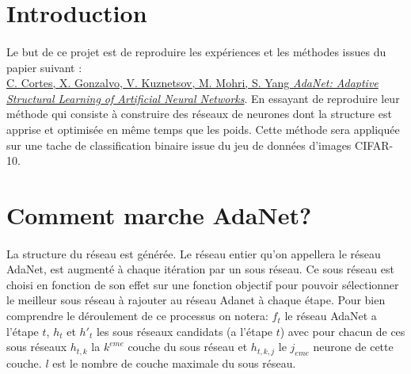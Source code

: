 \documentclass[11 pt]{article}
\begin{document}

\section*{Introduction}
\paragraph{}Le but de ce projet est de reproduire les expériences et les méthodes issues du papier suivant :\\
\href{https://arxiv.org/pdf/1607.01097.pdf}{C. Cortes, X. Gonzalvo, V. Kuznetsov, M. Mohri, S. Yang \emph{AdaNet: Adaptive Structural Learning of Artificial Neural Networks}}.
En essayant de reproduire leur méthode qui consiste à construire des réseaux de neurones dont la structure est apprise et optimisée en même temps que les poids. Cette méthode sera appliquée sur une tache de classification binaire issue du jeu de données d'images CIFAR-10.

\section{Comment marche AdaNet?}
\paragraph{}La structure du réseau est générée. Le réseau entier qu'on appellera le réseau AdaNet, est augment\'e à chaque itération par un sous réseau. Ce sous réseau est choisi en fonction de son effet sur une fonction objectif pour pouvoir sélectionner le meilleur sous réseau à rajouter au réseau Adanet à chaque étape. Pour bien comprendre le déroulement de ce processus on notera: $f_t$ le réseau AdaNet a l'étape $t$, $h_t$ et $h'_t$ les sous réseaux candidats (a l'étape $t$) avec pour chacun de ces sous réseaux $h_{t,k}$ la $k^{eme}$ couche du sous réseau et $h_{t,k,j}$ le $j_{eme}$ neurone de cette couche. $l$ est le nombre de couche maximale du sous réseau.
\end{document}
